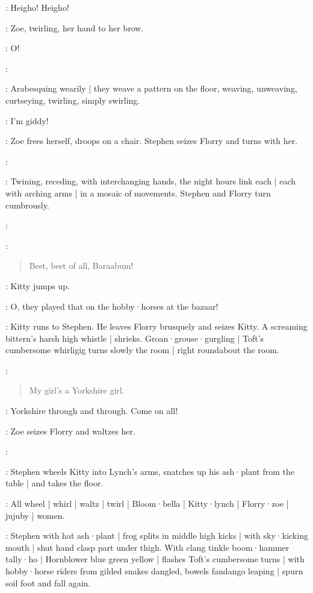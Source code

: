 \Bracelets:
Heigho!
Heigho!

:
Zoe,
twirling,
her hand to her brow.

\Zoe:
O!

\Maginni:

:
Arabesquing wearily |
they weave a pattern on the floor,
weaving,
unweaving,
curtseying,
twirling,
simply swirling.

\Zoe:
I'm giddy!

:
Zoe frees herself,
droops on a chair.
Stephen seizes Florry and turns with her.

\Maginni:

:
Twining,
receding,
with interchanging hands,
the night hours link each |
each with arching arms |
in a mosaic of movements.
%
Stephen and Florry turn cumbrously.

\Maginni:

\Pianola[2]:
\begin{verse}
    Best, best of all,
    Baraabum!
\end{verse}

:
Kitty jumps up.

\Kitty:
O,
they played that on the hobby·horses at the  bazaar!

:
Kitty runs to Stephen.
%
He leaves Florry brusquely and seizes Kitty.
A screaming bittern's harsh high whistle |
shrieks.
Groan·grouse·gurgling |
Toft's cumbersome whirligig turns slowly the room |
right roundabout the room.

\Pianola:
\begin{verse}
    My girl's a Yorkshire girl.
\end{verse}

\Zoe:
Yorkshire through and through.
Come on all!

:
Zoe seizes Florry and waltzes her.

\Stephen:

:
Stephen wheels Kitty into Lynch's arms,
snatches up his ash·plant from the table |
and takes the floor.

:
All wheel |
whirl |
waltz |
twirl |
Bloom·bella |
Kitty·lynch |
Florry·zoe |
jujuby |
women.

:
Stephen with hat ash·plant |
frog splits in middle high kicks |
with sky·kicking mouth |
shut hand clasp part under thigh.
With clang tinkle boom·hammer tally·ho |
Hornblower blue green yellow |
flashes Toft's cumbersome turns |
with hobby·horse riders from gilded snakes dangled,
bowels fandango leaping |
spurn soil foot and fall again.

